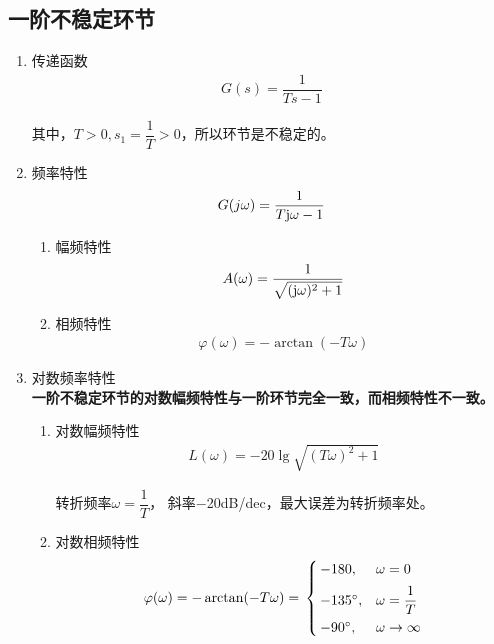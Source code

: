 \subsection{一阶不稳定环节}
\begin{enumerate}[1.]
	\item 传递函数
	\vspace*{-0.5em}
	\begin{align}
		G(s) =  \dfrac{1}{Ts - 1}
	\end{align}
	\vspace*{-2em}
	
	其中，$T>0,s_1 = \dfrac{1}{T} > 0$，所以环节是不稳定的。
	
	\item 频率特性
	\vspace*{-0.5em}
	\begin{align}
		G(j\omega) = \dfrac{1}{T \text{j} \omega - 1}
	\end{align}
	\vspace*{-3em}
	\begin{enumerate}[(1) ]
		\item 幅频特性
		\vspace*{-0.5em}
		\begin{align}
			A(\omega) = \dfrac{1}{\sqrt{(\text{j} \omega)^2 + 1}}
		\end{align}
		\vspace*{-3em}
		
		\item 相频特性
		\vspace*{-0.5em}
		\begin{align}
			\varphi(\omega) = - \arctan(- T \omega)
		\end{align}
		\vspace*{-3em}
	\end{enumerate}
	\item 对数频率特性\\
	\textbf{一阶不稳定环节的对数幅频特性与一阶环节完全一致，而相频特性不一致。}
	\begin{enumerate}[(1) ]
		\item 对数幅频特性
		\vspace*{-0.5em}
		\begin{align}
			L(\omega) = - 20 \lg \sqrt{(T\omega)^2 + 1}
		\end{align}
		\vspace*{-2em}
		
		转折频率$\omega = \dfrac{1}{T}$， 斜率$-$20dB/dec，最大误差为转折频率处。
		
		\item 对数相频特性
		\vspace*{-0.5em}
		\begin{align}
			\varphi(\omega) = - \arctan(- T \omega) = \,
			\begin{cases}
				\, -180, & \omega = 0\\[0.5em]
				\, -135{}^{\circ} , & \omega = \dfrac{1}{T}\\[0.5em]
				\, -90 {}^{\circ}, & \omega \to \infty
			\end{cases}
		\end{align}
		\vspace*{-1em}
		

\end{enumerate}
\end{enumerate}
